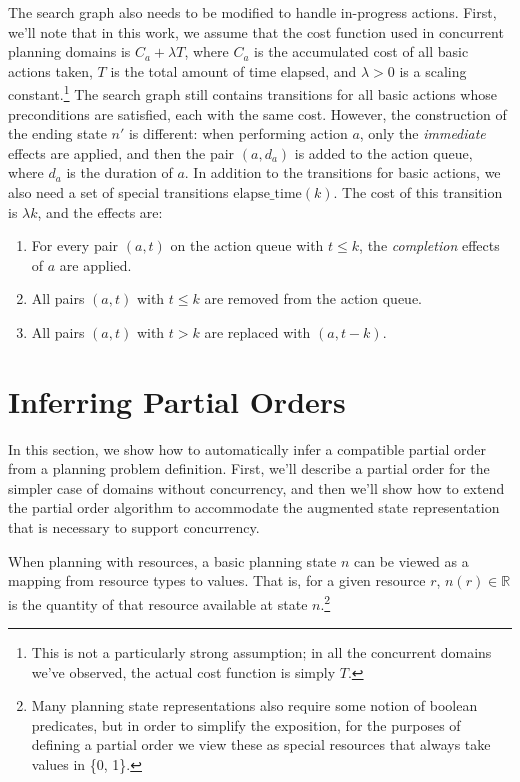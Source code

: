\documentclass[letterpaper]{article}
\theoremstyle{plain} \newtheorem{theorem}{Theorem} \newtheorem{proposition}{Proposition} \newtheorem{lemma}{Lemma}
\theoremstyle{definition} \newtheorem{definition}{Definition} \newtheorem{conjecture}{Conjecture} \newtheorem*{example}{Example}
\theoremstyle{remark} \newtheorem*{remark}{Remark} \newtheorem*{note}{Note} \newtheorem{case}{Case}
\newcommand{\R}{\mathbb{R}}
\begin{document}
The search graph also needs to be modified to handle in-progress actions. First, we'll note
that in this work, we assume that the cost function used in concurrent planning domains is
$C_a + \lambda T$, where $C_a$ is the accumulated cost of all basic actions taken, $T$ is
the total amount of time elapsed, and $\lambda > 0$ is a scaling constant.\footnote{This is
not a particularly strong assumption; in all the concurrent domains we've observed, the
actual cost function is simply $T$.} The search graph still contains transitions for all
basic actions whose preconditions are satisfied, each with the same cost. However, the
construction of the ending state $n'$ is different: when performing action $a$, only the
\emph{immediate} effects are applied, and then the pair $(a, d_a)$ is added to the action
queue, where $d_a$ is the duration of $a$. In addition to the transitions for basic actions, we also need a set of special transitions $\mathrm{elapse\_time}(k)$. The cost of this transition is $\lambda k$, and the effects are: 
\begin{enumerate}
	\item For every pair $(a, t)$ on the action queue with $t \le k$, the \emph{completion} effects of $a$ are applied.
	\item All pairs $(a, t)$ with $t \le k$ are removed from the action queue.
	\item All pairs $(a, t)$ with $t > k$ are replaced with $(a, t-k)$.
\end{enumerate}



\section{Inferring Partial Orders}

\newcommand{\po}{\preceq_R}

In this section, we show how to automatically infer a compatible partial order from a
planning problem definition. First, we'll describe a partial order for the simpler case of
domains without concurrency, and then we'll show how to extend the partial order algorithm
to accommodate the augmented state representation that is necessary to support concurrency.

When planning with resources, a basic planning state $n$ can be viewed as a mapping from
resource types to values. That is, for a given resource $r$, $n(r) \in \R$ is the quantity
of that resource available at state $n$.\footnote{Many planning state representations also
require some notion of boolean predicates, but in order to simplify the exposition, for the
purposes of defining a partial order we view these as special resources that always take
values in \{0, 1\}.}
\end{document}
